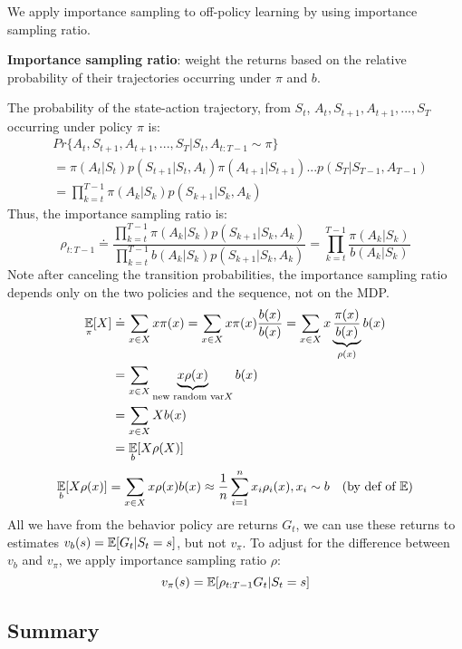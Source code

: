 \documentclass[sutton_barto_notes.tex]{subfiles}
\begin{document}
We apply importance sampling to off-policy learning by using importance sampling ratio.
\begin{definition}
\textbf{Importance sampling ratio}: weight the returns based on the relative probability of their trajectories occurring under $\pi$ and $b$.
\end{definition}
The probability of the state-action trajectory, from $S_t$, $A_t, S_{t+1}, A_{t+1},...,S_T$ occurring under policy $\pi$ is:
\begin{align*}
& Pr\{A_t, S_{t+1}, A_{t+1}, ..., S_T | S_t, A_{t:T-1} \sim \pi\}\\
& = \pi(A_t|S_t)p(S_{t+1} | S_t, A_t) \pi(A_{t+1} | S_{t+1}) ... p(S_T | S_{T-1}, A_{T-1}) \\
& = \prod_{k=t}^{T-1} \pi(A_k|S_k)p(S_{k+1} | S_k, A_k)
\end{align*}
Thus, the importance sampling ratio is:
$$ \rho_{t:T-1} \doteq \frac{\prod_{k=t}^{T-1} \pi(A_k|S_k)p(S_{k+1} | S_k, A_k)}{\prod_{k=t}^{T-1} b(A_k|S_k)p(S_{k+1} | S_k, A_k)} = \prod_{k=t}^{T-1} \frac{\pi(A_k|S_k)}{b(A_k|S_k)} $$
Note after canceling the transition probabilities, the importance sampling ratio depends only on the two policies and the sequence, not on the MDP.
\begin{align*}
\operatorname*{\mathbb{E}}_\pi [X] & \doteq \sum_{x \in X} x \pi(x) = \sum_{x \in X} x\pi(x) \frac{b(x)}{b(x)} = \sum_{x \in X} x \underbrace{\frac{\pi(x)}{b(x)}}_{\rho(x)} b(x) \\
& = \sum_{x \in X} \underbrace{x \rho(x)}_{\text{new random var} X} b(x) \\
& = \sum_{x \in X} X b(x)\\
& = \operatorname*{\mathbb{E}}_b [X \rho(X)]
\end{align*}
$$\operatorname*{\mathbb{E}}_b[X\rho(x)] = \sum_{x \in X} x \rho(x) b(x) \approx \frac{1}{n}\sum_{i=1}^n x_i \rho_i (x), x_i \sim b\quad \text{(by def of $\operatorname*{\mathbb{E}}$)}$$
All we have from the behavior policy are returns $G_t$, we can use these returns to estimates $v_b(s) = \operatorname*{\mathbb{E}} [G_t | S_t = s]$, but not $v_\pi$. To adjust for the difference between $v_b$ and $v_\pi$, we apply importance sampling ratio $\rho$:
$$ v_\pi(s) = \operatorname*{\mathbb{E}} [ \rho_{t:T-1} G_t | S_t = s] $$

\subsection{Summary}
\end{document}
